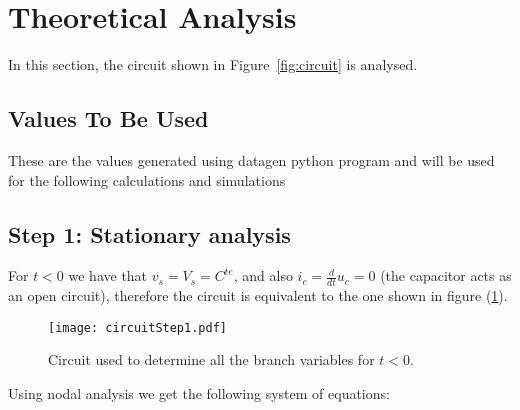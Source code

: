 \section{Theoretical Analysis}
\label{sec:analysis}

In this section, the circuit shown in Figure~\ref{fig:circuit} is analysed.



\vspace{10mm}

\subsection{Values To Be Used}

These are the values generated using datagen python program and will be used for the following calculations and simulations



\subsection{Step 1: Stationary analysis}    
For $t < 0$ we have that $v_s = V_s = C^{te}$, and also $i_c = \frac{d}{dt}u_c = 0 $ (the capacitor acts as an open circuit), therefore the circuit is equivalent to the one shown in figure (\ref{fig: step1}).

\begin{figure}[H] \centering
  \texttt{[image: circuitStep1.pdf]}
  \caption{Circuit used to determine all the branch variables for $t < 0$.}
  \label{fig: step1}
\end{figure}    	
Using nodal analysis we get the following system of equations:
\vspace{1.0cm}

